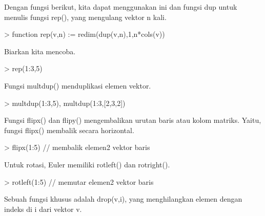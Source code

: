 \documentclass[a4paper,10pt]{article}
\begin{document}
\begin{eulernotebook}
\begin{eulercomment}
\begin{eulercomment}
\begin{eulercomment}
\begin{eulercomment}
\begin{eulercomment}
\begin{eulercomment}
\begin{eulercomment}
Dengan fungsi berikut, kita dapat menggunakan ini dan fungsi dup untuk
menulis fungsi rep(), yang mengulang vektor n kali.
\end{eulercomment}
\begin{eulerprompt}
> function rep(v,n) := redim(dup(v,n),1,n*cols(v))
\end{eulerprompt}
\begin{eulercomment}
Biarkan kita mencoba.
\end{eulercomment}
\begin{eulerprompt}
> rep(1:3,5)
\end{eulerprompt}
\begin{euleroutput}
  [1,  2,  3,  1,  2,  3,  1,  2,  3,  1,  2,  3,  1,  2,  3]
\end{euleroutput}
\begin{eulercomment}
Fungsi multdup() menduplikasi elemen vektor.
\end{eulercomment}
\begin{eulerprompt}
> multdup(1:3,5), multdup(1:3,[2,3,2])
\end{eulerprompt}
\begin{euleroutput}
  [1,  1,  1,  1,  1,  2,  2,  2,  2,  2,  3,  3,  3,  3,  3]
  [1,  1,  2,  2,  2,  3,  3]
\end{euleroutput}
\begin{eulercomment}
Fungsi flipx() dan flipy() mengembalikan urutan baris atau kolom
matriks. Yaitu, fungsi flipx() membalik secara horizontal.
\end{eulercomment}
\begin{eulerprompt}
> flipx(1:5) // membalik elemen2 vektor baris
\end{eulerprompt}
\begin{euleroutput}
  [5,  4,  3,  2,  1]
\end{euleroutput}
\begin{eulercomment}
Untuk rotasi, Euler memiliki rotleft() dan rotright().
\end{eulercomment}
\begin{eulerprompt}
> rotleft(1:5) // memutar elemen2 vektor baris
\end{eulerprompt}
\begin{euleroutput}
  [2,  3,  4,  5,  1]
\end{euleroutput}
\begin{eulercomment}
Sebuah fungsi khusus adalah drop(v,i), yang menghilangkan elemen
dengan indeks di i dari vektor v.
\end{eulercomment}
\begin{eulerprompt}

\end{eulerprompt}
\end{eulercomment}
\end{eulercomment}
\end{eulercomment}
\end{eulercomment}
\end{eulercomment}
\end{eulercomment}
\end{eulernotebook}
\end{document}
